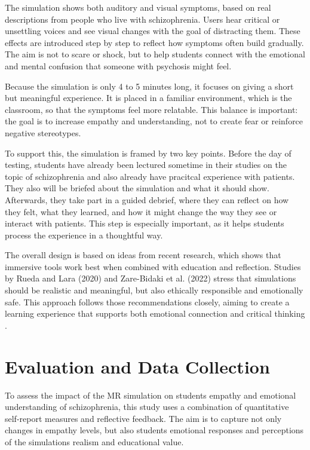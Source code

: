 The simulation shows both auditory and visual symptoms, based on real descriptions from people who live with schizophrenia. Users hear critical or unsettling voices and see visual changes with the goal of distracting them. These effects are introduced step by step to reflect how symptoms often build gradually. The aim is not to scare or shock, but to help students connect with the emotional and mental confusion that someone with psychosis might feel.

Because the simulation is only 4 to 5 minutes long, it focuses on giving a short but meaningful experience. It is placed in a familiar environment, which is the classroom, so that the symptoms feel more relatable. This balance is important: the goal is to increase empathy and understanding, not to create fear or reinforce negative stereotypes. %

To support this, the simulation is framed by two key points. Before the day of testing, students have already been lectured sometime in their studies on the topic of schizophrenia and also already have pracitcal experience with patients. They also will be briefed about the simulation and what it should show. Afterwards, they take part in a guided debrief, where they can reflect on how they felt, what they learned, and how it might change the way they see or interact with patients. This step is especially important, as it helps students process the experience in a thoughtful way.

The overall design is based on ideas from recent research, which shows that immersive tools work best when combined with education and reflection. Studies by Rueda and Lara (2020) and Zare-Bidaki et al. (2022) stress that simulations should be realistic and meaningful, but also ethically responsible and emotionally safe. This approach follows those recommendations closely, aiming to create a learning experience that supports both emotional connection and critical thinking \cite{Rueda2020,Zare-Bidaki2022}.

\section{Evaluation and Data Collection}
\label{ch:eval}

To assess the impact of the MR simulation on students empathy and emotional understanding of schizophrenia, this study uses a combination of quantitative self-report measures and reflective feedback. The aim is to capture not only changes in empathy levels, but also students emotional responses and perceptions of the simulations realism and educational value.

